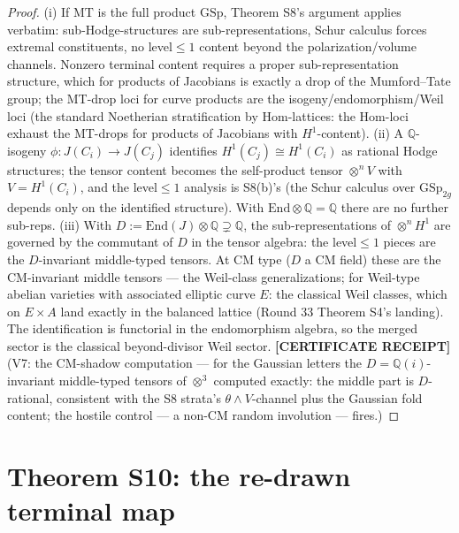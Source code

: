 \documentclass[11pt]{article}
\newcommand{\CERT}{\textbf{[CERTIFICATE RECEIPT]}}
\newcommand{\Q}{\mathbb{Q}}
\newcommand{\Hom}{\mathrm{Hom}}
\newcommand{\End}{\mathrm{End}}
\newcommand{\MT}{\mathrm{MT}}
\newcommand{\GSp}{\mathrm{GSp}}
\begin{document}
\begin{proof}
(i) If $\MT$ is the full product $\GSp$, Theorem S8's argument applies
verbatim: sub-Hodge-structures are sub-representations, Schur calculus
forces extremal constituents, no level${}\le1$ content beyond the
polarization/volume channels. Nonzero terminal content requires a proper
sub-representation structure, which for products of Jacobians is exactly
a drop of the Mumford--Tate group; the MT-drop loci for curve products
are the isogeny/endomorphism/Weil loci (the standard Noetherian
stratification by $\Hom$-lattices: the Hom-loci exhaust the
MT-drops for products of Jacobians with $H^1$-content).
(ii) A $\Q$-isogeny $\phi\colon J(C_i)\to J(C_j)$ identifies
$H^1(C_j)\cong H^1(C_i)$ as rational Hodge structures; the tensor
content becomes the self-product tensor $\otimes^n V$ with
$V=H^1(C_i)$, and the level${}\le1$ analysis is S8(b)'s (the
Schur calculus over $\GSp_{2g}$ depends only on the identified
structure). With $\End\otimes\Q=\Q$ there are no further sub-reps.
(iii) With $D:=\End(J)\otimes\Q\supsetneq\Q$, the sub-representations of
$\otimes^nH^1$ are governed by the commutant of $D$ in the tensor
algebra: the level${}\le1$ pieces are the $D$-invariant middle-typed
tensors. At CM type ($D$ a CM field) these are the CM-invariant middle
tensors --- the Weil-class generalizations; for Weil-type abelian
varieties with associated elliptic curve $E$: the classical Weil
classes, which on $E\times A$ land exactly in the balanced lattice
(Round 33 Theorem S4's landing). The identification is functorial in
the endomorphism algebra, so the merged sector is the classical
beyond-divisor Weil sector. \CERT{} (V7: the CM-shadow computation ---
for the Gaussian letters the $D=\Q(i)$-invariant middle-typed tensors of
$\otimes^3$ computed exactly: the middle part is $D$-rational,
consistent with the S8 strata's $\theta\wedge V$-channel plus the
Gaussian fold content; the hostile control --- a non-CM random
involution --- fires.)
\end{proof}

\section{Theorem S10: the re-drawn terminal map}
\end{document}
